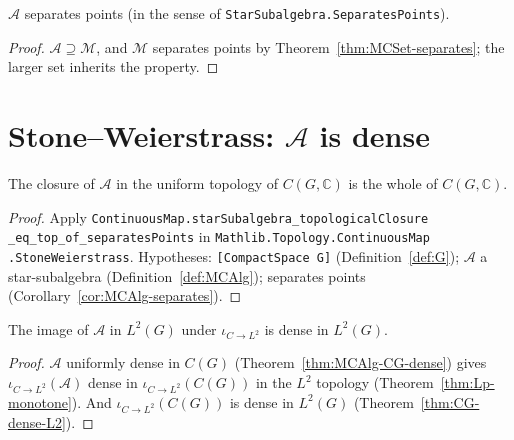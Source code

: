 \begin{corollary}
  \label{cor:MCAlg-separates}
  \leanok
  $\mathcal A$ separates points (in the sense of
  \texttt{StarSubalgebra.SeparatesPoints}).
\end{corollary}

\begin{proof}
  $\mathcal A \supseteq \mathcal M$, and $\mathcal M$ separates points
  by Theorem~\ref{thm:MCSet-separates}; the larger set inherits the
  property.
\end{proof}

\section{Stone--Weierstrass: $\mathcal A$ is dense}

\begin{theorem}
  \label{thm:MCAlg-CG-dense}
  \leanok
  The closure of $\mathcal A$ in the uniform topology of
  $C(G, \mathbb C)$ is the whole of $C(G, \mathbb C)$.
\end{theorem}

\begin{proof}
  Apply
  \texttt{ContinuousMap.starSubalgebra\_topologicalClosure}\allowbreak%
  \texttt{\_eq\_top\_of\_separatesPoints}
  in \texttt{Mathlib.Topology.ContinuousMap}\allowbreak%
  \texttt{.StoneWeierstrass}.
  Hypotheses: \texttt{[CompactSpace G]} (Definition~\ref{def:G});
  $\mathcal A$ a star-subalgebra (Definition~\ref{def:MCAlg}); separates
  points (Corollary~\ref{cor:MCAlg-separates}).
\end{proof}

\begin{corollary}
  \label{cor:MCAlg-L2-dense}
  \leanok
  The image of $\mathcal A$ in $L^2(G)$ under $\iota_{C\to L^2}$ is
  dense in $L^2(G)$.
\end{corollary}

\begin{proof}
  $\mathcal A$ uniformly dense in $C(G)$
  (Theorem~\ref{thm:MCAlg-CG-dense}) gives $\iota_{C\to L^2}(\mathcal A)$
  dense in $\iota_{C\to L^2}(C(G))$ in the $L^2$ topology
  (Theorem~\ref{thm:Lp-monotone}). And $\iota_{C\to L^2}(C(G))$ is
  dense in $L^2(G)$ (Theorem~\ref{thm:CG-dense-L2}).
\end{proof}


